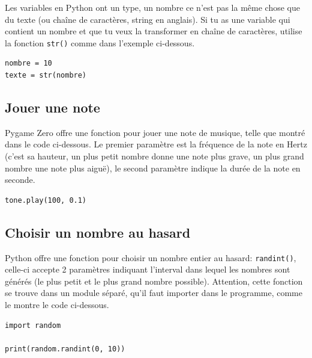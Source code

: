 \documentclass[11pt]{article}
\begin{document}
Les variables en Python ont un type, un nombre ce n'est pas la même chose que du texte (ou chaîne de caractères, string en anglais). Si tu as une variable qui contient un nombre et que tu veux la transformer en chaîne de caractères, utilise la fonction \lstinline{str()} comme dans l'exemple ci-dessous.

\begin{lstlisting}
nombre = 10
texte = str(nombre)
\end{lstlisting}

\subsection*{Jouer une note}

Pygame Zero offre une fonction pour jouer une note de musique, telle que montré dans le code ci-dessous. Le premier paramètre est la fréquence de la note en Hertz (c'est sa hauteur, un plus petit nombre donne une note plus grave, un plus grand nombre une note plus aiguë), le second paramètre indique la durée de la note en seconde.

\begin{lstlisting}
tone.play(100, 0.1)
\end{lstlisting}

\subsection*{Choisir un nombre au hasard}

Python offre une fonction pour choisir un nombre entier au hasard: \lstinline{randint()}, celle-ci accepte 2 paramètres indiquant l'interval dans lequel les nombres sont générés (le plus petit et le plus grand nombre possible). Attention, cette fonction se trouve dans un module séparé, qu'il faut importer dans le programme, comme le montre le code ci-dessous.

\begin{lstlisting}
import random

print(random.randint(0, 10))
\end{lstlisting}
\end{document}
